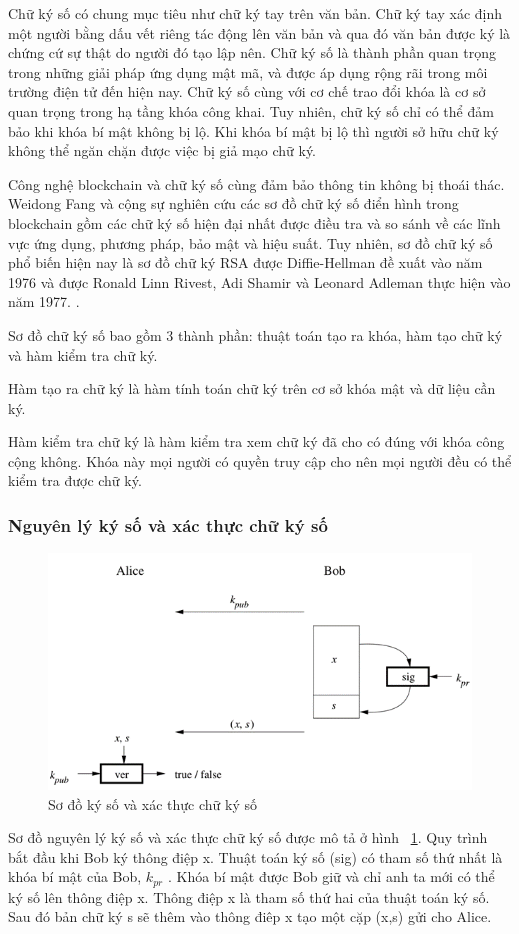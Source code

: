 Chữ ký số có chung mục tiêu như chữ ký tay trên văn bản. Chữ ký tay xác định một người bằng dấu vết riêng tác động lên văn bản và qua đó văn bản được ký là chứng cứ sự thật do người đó tạo lập nên. Chữ ký số là thành phần quan trọng trong những giải pháp ứng dụng mật mã, và được áp dụng rộng rãi trong môi trường điện tử đến hiện nay. Chữ ký số cùng với cơ chế trao đổi khóa là cơ sở quan trọng trong hạ tầng khóa công khai. Tuy nhiên, chữ ký số chỉ có thể đảm bảo khi khóa bí mật không bị lộ. Khi khóa bí mật bị lộ thì người sở hữu chữ ký không thể ngăn chặn được việc bị giả mạo chữ ký.

Công nghệ blockchain và chữ ký số cùng đảm bảo thông tin không bị thoái thác. Weidong Fang và cộng sự \cite{Fang2020} nghiên cứu các sơ đồ chữ ký số điển hình trong blockchain gồm các chữ ký số hiện đại nhất được điều tra và so sánh về các lĩnh vực ứng dụng, phương pháp, bảo mật và hiệu suất.
Tuy nhiên, sơ đồ chữ ký số phổ biến hiện nay là sơ đồ chữ ký RSA được Diffie-Hellman đề xuất vào năm 1976 và được Ronald Linn Rivest, Adi Shamir và Leonard Adleman thực hiện vào năm 1977. \cite{10.5555/1721909}. 

Sơ đồ chữ ký số bao gồm 3 thành phần: thuật toán tạo ra khóa, hàm tạo chữ ký và hàm kiểm tra chữ ký.

Hàm tạo ra chữ ký là hàm tính toán chữ ký trên cơ sở khóa mật và dữ liệu cần ký.

Hàm kiểm tra chữ ký là hàm kiểm tra xem chữ ký đã cho có đúng với khóa công cộng không. Khóa này mọi người có quyền truy cập cho nên mọi người đều có thể kiểm tra được chữ ký.

\subsubsection{Nguyên lý ký số và xác thực chữ ký số }

\begin{figure}[htbp]
\centering
\includegraphics[width=.9\linewidth]{img/dig_sig.png}
\caption{Sơ đồ ký số và xác thực chữ ký số}
\label{fig:dig_sig}
\end{figure}
Sơ đồ nguyên lý ký số và xác thực chữ ký số\cite{10.5555/1721909} được mô tả ở hình ~\ref{fig:dig_sig}.
Quy trình bắt đầu khi Bob ký thông điệp x. Thuật toán ký số (sig) có tham số thứ nhất là khóa bí mật của Bob, $k_{pr}$ . Khóa bí mật được Bob giữ và chỉ anh ta mới có thể ký số lên thông điệp x. Thông điệp x là tham số thứ hai của thuật toán ký số. Sau đó bản chữ ký s sẽ thêm vào thông điêp x tạo một cặp (x,s) gửi cho Alice.
 
